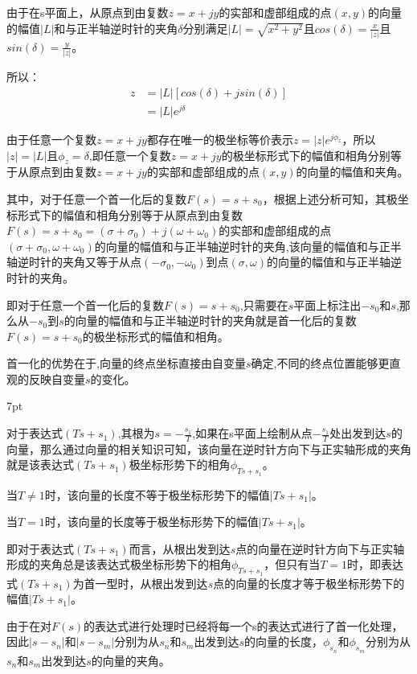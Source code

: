 \documentclass{article}
\numberwithin{equation}{section}
\numberwithin{figure}{section}
\newenvironment{formal}{%
\def\FrameCommand{%
\hspace{1pt}%
{\color{DarkBlue}\vrule width 2pt}%
{\color{formalshade}\vrule width 4pt}%
\colorbox{formalshade}%
}%
\MakeFramed{\advance\hsize-\width\FrameRestore}%
\noindent\hspace{-4.55pt}%
\begin{adjustwidth}{}{7pt}%
\vspace{2pt}\vspace{2pt}%
}
{%
\vspace{2pt}\end{adjustwidth}\endMakeFramed%
}
\begin{document}
由于在s平面上，从原点到由复数$z=x+jy$的实部和虚部组成的点$(x,y)$的向量的幅值$|L|$和与正半轴逆时针的夹角$\delta$分别满足$|L|=\sqrt{x^2+y^2}$且$cos(\delta)=\frac{x}{|z|}$且$sin(\delta)=\frac{y}{|z|}$。

所以：
\begin{equation}
    \begin{split}
        z&=|L|[cos(\delta)+jsin(\delta)]\\
        &=|L|e^{j\delta}
    \end{split}
\end{equation}

由于任意一个复数$z=x+jy$都存在唯一的极坐标等价表示$z=|z|e^{j\phi_z}$，所以$|z|=|L|$且$\phi_z=\delta$,即任意一个复数$z=x+jy$的极坐标形式下的幅值和相角分别等于从原点到由复数$z=x+jy$的实部和虚部组成的点$(x,y)$的向量的幅值和夹角。

其中，对于任意一个首一化后的复数$F(s)=s+s_0$，根据上述分析可知，其极坐标形式下的幅值和相角分别等于从原点到由复数$F(s)=s+s_0=(\sigma+\sigma_0)+j(\omega+\omega_0)$的实部和虚部组成的点$(\sigma+\sigma_0,\omega+\omega_0)$的向量的幅值和与正半轴逆时针的夹角,该向量的幅值和与正半轴逆时针的夹角又等于从点$(-\sigma_0,-\omega_0)$到点$(\sigma,\omega)$的向量的幅值和与正半轴逆时针的夹角。

即对于任意一个首一化后的复数$F(s)=s+s_0$,只需要在$s$平面上标注出$-s_0$和$s$,那么从$-s_0$到$s$的向量的幅值和与正半轴逆时针的夹角就是首一化后的复数$F(s)=s+s_0$的极坐标形式的幅值和相角。

首一化的优势在于,向量的终点坐标直接由自变量$s$确定,不同的终点位置能够更直观的反映自变量$s$的变化。

\begin{formal}
    对于表达式$(Ts+s_1)$,其根为$s=-\frac{s_1}{T}$,如果在s平面上绘制从点$-\frac{s_1}{T}$处出发到达$s$的向量，那么通过向量的相关知识可知，该向量在逆时针方向下与正实轴形成的夹角就是该表达式$(Ts+s_1)$极坐标形势下的相角$\phi_{Ts+s_1}$。

    当$T\neq 1$时，该向量的长度不等于极坐标形势下的幅值$|Ts+s_1|$。

    当$T=1$时，该向量的长度等于极坐标形势下的幅值$|Ts+s_1|$。
\end{formal}

即对于表达式$(Ts+s_1)$而言，从根出发到达$s$点的向量在逆时针方向下与正实轴形成的夹角总是该表达式极坐标形势下的相角$\phi_{Ts+s_1}$，但只有当$T=1$时，即表达式$(Ts+s_1)$为首一型时，从根出发到达$s$点的向量的长度才等于极坐标形势下的幅值$|Ts+s_1|$。

由于在对$F(s)$的表达式进行处理时已经将每一个s的表达式进行了首一化处理，因此$|s-s_n|$和$|s-s_m|$分别为从$s_n$和$s_m$出发到达$s$的向量的长度，$\phi_{s_n}$和$\phi_{s_m}$分别为从$s_n$和$s_m$出发到达$s$的向量的夹角。
\end{document}
